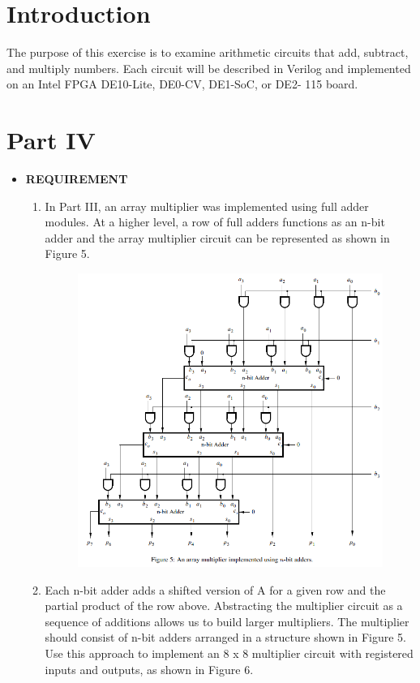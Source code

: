 
\section{Introduction}
The purpose of this exercise is to examine arithmetic circuits that add, subtract, and multiply numbers. Each circuit will be described in Verilog and implemented on an Intel FPGA DE10-Lite, DE0-CV, DE1-SoC, or DE2- 115 board.
\section{Part IV}
\begin{itemize}
    \item [] \textbf{REQUIREMENT}
        \begin{enumerate}
            \item In Part III, an array multiplier was implemented using full adder modules. At a higher level, a row of full adders functions as an n-bit adder and the array multiplier circuit can be represented as shown in Figure 5.
                 \begin{figure}[h]
                    \centering
                    \includegraphics[scale = 0.75]{source/picture/Lab6/Lab6_4_0.png}
                \end{figure}
\clearpage
            \item Each n-bit adder adds a shifted version of A for a given row and the partial product of the row above. Abstracting the multiplier circuit as a sequence of additions allows us to build larger multipliers. The multiplier should consist of n-bit adders arranged in a structure shown in Figure 5. Use this approach to implement an 8 x 8 multiplier circuit with registered inputs and outputs, as shown in Figure 6.

\end{enumerate}
\end{itemize}
